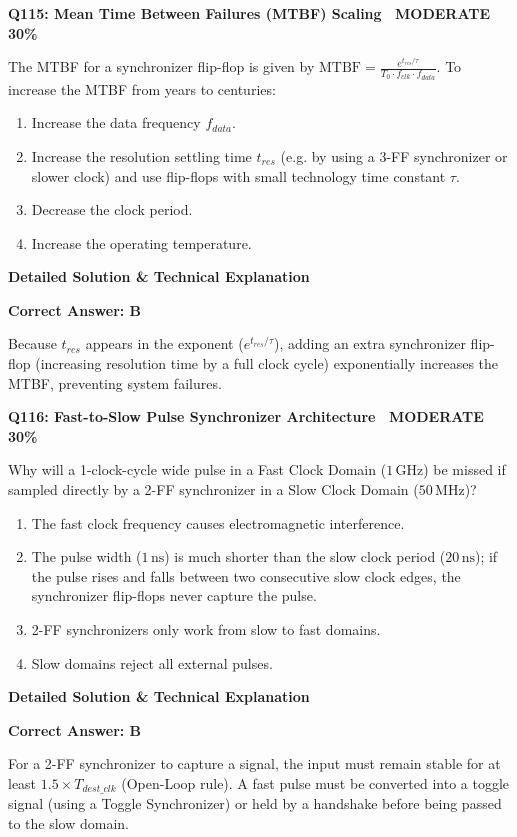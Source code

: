 \documentclass[11pt,a4paper]{article}
\newcommand{\badgemod}{{\color{white}\colorbox{modoran}{\bfseries\sffamily\tiny\ MODERATE 30\%\ }}}
\newenvironment{qbox}[2]{%
  \begin{mdframed}[style=qstyle]%
  {\bfseries\sffamily\color{primaryblue}#1 \hfill #2}\par\vspace{2pt}%
}{%
  \end{mdframed}%
}
\newenvironment{ansbox}{%
  \begin{mdframed}[style=ansstyle]%
  {\bfseries\sffamily\color{ansgreen}\small Detailed Solution \& Technical Explanation}\par\vspace{2pt}\small%
}{%
  \end{mdframed}%
}
\begin{document}
\begin{qbox}{Q115: Mean Time Between Failures (MTBF) Scaling}{\badgemod}
The MTBF for a synchronizer flip-flop is given by $\text{MTBF} = \frac{e^{t_{res} / \tau}}{T_0 \cdot f_{clk} \cdot f_{data}}$.  
To increase the MTBF from years to centuries:
\begin{enumerate}[label=\textbf{\Alph*.}]
  \item Increase the data frequency $f_{data}$.
  \item Increase the resolution settling time $t_{res}$ (e.g. by using a 3-FF synchronizer or slower clock) and use flip-flops with small technology time constant $\tau$.
  \item Decrease the clock period.
  \item Increase the operating temperature.
\end{enumerate}
\end{qbox}
\begin{ansbox}
\textbf{Correct Answer: B}

Because $t_{res}$ appears in the exponent ($e^{t_{res}/\tau}$), adding an extra synchronizer flip-flop (increasing resolution time by a full clock cycle) exponentially increases the MTBF, preventing system failures.
\end{ansbox}

\begin{qbox}{Q116: Fast-to-Slow Pulse Synchronizer Architecture}{\badgemod}
Why will a 1-clock-cycle wide pulse in a Fast Clock Domain ($1\,\text{GHz}$) be missed if sampled directly by a 2-FF synchronizer in a Slow Clock Domain ($50\,\text{MHz}$)?
\begin{enumerate}[label=\textbf{\Alph*.}]
  \item The fast clock frequency causes electromagnetic interference.
  \item The pulse width ($1\,\text{ns}$) is much shorter than the slow clock period ($20\,\text{ns}$); if the pulse rises and falls between two consecutive slow clock edges, the synchronizer flip-flops never capture the pulse.
  \item 2-FF synchronizers only work from slow to fast domains.
  \item Slow domains reject all external pulses.
\end{enumerate}
\end{qbox}
\begin{ansbox}
\textbf{Correct Answer: B}

For a 2-FF synchronizer to capture a signal, the input must remain stable for at least $1.5 \times T_{dest\_clk}$ (Open-Loop rule). A fast pulse must be converted into a toggle signal (using a Toggle Synchronizer) or held by a handshake before being passed to the slow domain.
\end{ansbox}
\end{document}
